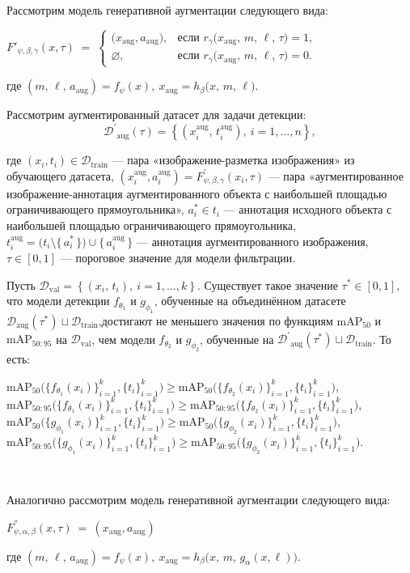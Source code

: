 Рассмотрим модель генеративной аугментации следующего вида:
\begin{center}
$F'_{\psi,\beta,\gamma}(x, \tau) \;=\;
\begin{cases}
\bigl(x_{\text{aug}}, a_{\text{aug}}), 
& \text{если } r_{\gamma}\bigl(x_{\text{aug}},\,m,\,\ell,\,\tau\bigr) = 1,\\[1em]
\varnothing, 
& \text{если } r_{\gamma}\bigl(x_{\text{aug}},\,m,\,\ell,\,\tau\bigr) = 0.
\end{cases}
$
\end{center}
где 
$ 
(m,\,\ell,\, a_{\text{aug}}) = f_{\psi}(x),  \ x_{\text{aug}} = h_{\beta}\bigl(x,\,m,\, \ell \bigr)$.

Рассмотрим аугментированный датасет для задачи детекции:
\[
\mathcal{D^{'}}_{\text{aug}}(\tau) =
\left\{
  (x_i^{\text{aug}},\,t_i^{\text{aug}}), \
  i = 1,\dots,n
\right\},
\]

где $(x_i, t_i) \in \mathcal{D}_{\mathrm{train}}$ — пара «изображение-разметка изображения» из обучающего датасета,
$(x_i^{\mathrm{aug}}, a_i^{\mathrm{aug}}) = F^{'}_{\psi,\beta,\gamma}(x_i, \tau)$ — пара «аугментированное изображение-аннотация аугментированного объекта с наибольшей площадью ограничивающего прямоугольника»,
$a_i^* \in t_i$ — аннотация исходного объекта с наибольшей площадью ограничивающего прямоугольника,
$t_i^{\mathrm{aug}} = \bigl(t_i \setminus \{\,a_i^*\,\}\bigr) \cup \{\,a_i^{\mathrm{aug}}\,\}$ — аннотация аугментированного изображения,
$\tau \in [0,1]$ — пороговое значение для модели фильтрации.
\begin{statement2}
Пусть $\mathcal{D}_{\text{val}} =
\left\{
  (x_i,\,t_i), \
  i = 1,\dots,k
\right\}$. Существует такое значение $\tau^*\in[0,1]$, что модели детекции $f_{\theta_1}$ и $g_{\phi_1}$, обученные на объединённом датасете $\mathcal{D}_{\mathrm{aug}}(\tau^*)\sqcup\mathcal{D}_{\mathrm{train}}$,достигают не меньшего значения по функциям $\mathrm{mAP}_{50}$ и $\mathrm{mAP}_{50:95}$ на $\mathcal{D}_{\text{val}}$, чем модели $f_{\theta_2}$ и $g_{\phi_2}$, обученные на $\mathcal{D^{'}}_{\text{aug}}(\tau^{*}) \sqcup \mathcal{D}_{\text{train}}$. То есть:
\begin{center}
$\mathrm{mAP}_{50}\bigl(\{f_{\theta_1}(x_i)\}_{i=1}^k,\{t_i\}_{i=1}^k\bigr)\ge\mathrm{mAP}_{50}\bigl(\{f_{\theta_2}(x_i)\}_{i=1}^k,\{t_i\}_{i=1}^k\bigr)$,  
$\mathrm{mAP}_{50:95}\bigl(\{f_{\theta_1}(x_i)\}_{i=1}^k,\{t_i\}_{i=1}^k\bigr)\ge\mathrm{mAP}_{50:95}\bigl(\{f_{\theta_2}(x_i)\}_{i=1}^k,\{t_i\}_{i=1}^k\bigr)$,  
$\mathrm{mAP}_{50}\bigl(\{g_{\phi_1}(x_i)\}_{i=1}^k,\{t_i\}_{i=1}^k\bigr)\ge\mathrm{mAP}_{50}\bigl(\{g_{\phi_2}(x_i)\}_{i=1}^k,\{t_i\}_{i=1}^k\bigr)$,  
$\mathrm{mAP}_{50:95}\bigl(\{g_{\phi_1}(x_i)\}_{i=1}^k,\{t_i\}_{i=1}^k\bigr)\ge\mathrm{mAP}_{50:95}\bigl(\{g_{\phi_2}(x_i)\}_{i=1}^k,\{t_i\}_{i=1}^k\bigr)$.
\end{center}
\
\end{statement2}
Аналогично рассмотрим модель генеративной аугментации следующего вида:
\begin{center}
$F^{''}_{\psi,\alpha,\beta}(x, \tau) \ = \ (x_{\text{aug}}, a_{\text{aug}})$
\end{center}
где 
$ 
(m,\,\ell,\, a_{\text{aug}}) = f_{\psi}(x),  \ x_{\text{aug}} = h_{\beta}\bigl(x,\,m,\,g_{\alpha}(x, \ell)\bigr)$.

